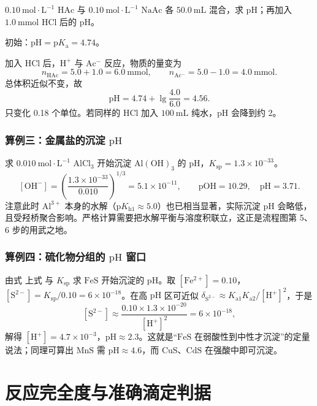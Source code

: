 \documentclass[UTF8]{ctexbook}
\begin{document}
$0.10\ \mathrm{mol\cdot L^{-1}}$ $\mathrm{HAc}$ 与 $0.10\ \mathrm{mol\cdot L^{-1}}$ $\mathrm{NaAc}$ 各 $50.0\ \mathrm{mL}$ 混合，求 $\mathrm{pH}$；再加入 $1.0\ \mathrm{mmol}$ $\mathrm{HCl}$ 后的 $\mathrm{pH}$。

初始：$\mathrm{pH}=\mathrm{p}K_{\mathrm{a}}=4.74$。

加入 $\mathrm{HCl}$ 后，$\mathrm{H^+}$ 与 $\mathrm{Ac^-}$ 反应，物质的量变为
\[
n_{\mathrm{HAc}}=5.0+1.0=6.0\ \mathrm{mmol},\qquad
n_{\mathrm{Ac^-}}=5.0-1.0=4.0\ \mathrm{mmol}.
\]
总体积近似不变，故
\[
\mathrm{pH}=4.74+\lg\frac{4.0}{6.0}=4.56.
\]
只变化 0.18 个单位。若同样的 $\mathrm{HCl}$ 加入 $100\ \mathrm{mL}$ 纯水，$\mathrm{pH}$ 会降到约 2。

\subsubsection{算例三：金属盐的沉淀 $\mathrm{pH}$}

求 $0.010\ \mathrm{mol\cdot L^{-1}}$ $\mathrm{AlCl_3}$ 开始沉淀 $\mathrm{Al(OH)_3}$ 的 $\mathrm{pH}$，$K_{\mathrm{sp}}=1.3\times10^{-33}$。
\[
[\mathrm{OH^-}]=\left(\frac{1.3\times10^{-33}}{0.010}\right)^{1/3}=5.1\times10^{-11},
\qquad
\mathrm{pOH}=10.29,\quad \mathrm{pH}=3.71.
\]
注意此时 $\mathrm{Al^{3+}}$ 本身的水解（$\mathrm{p}K_{\mathrm{h1}}\approx5.0$）也已相当显著，实际沉淀 $\mathrm{pH}$ 会略低，且受羟桥聚合影响。严格计算需要把水解平衡与溶度积联立，这正是流程图第 5、6 步的用武之地。

\subsubsection{算例四：硫化物分组的 $\mathrm{pH}$ 窗口}

由式 上式 与 $K_{\mathrm{sp}}$ 求 $\mathrm{FeS}$ 开始沉淀的 $\mathrm{pH}$。取 $[\mathrm{Fe^{2+}}]=0.10$，$[\mathrm{S^{2-}}]=K_{\mathrm{sp}}/0.10=6\times10^{-18}$。在高 $\mathrm{pH}$ 区可近似 $\delta_{\mathrm{S^{2-}}}\approx K_{\mathrm{a1}}K_{\mathrm{a2}}/[\mathrm{H^+}]^2$，于是
\[
[\mathrm{S^{2-}}]\approx\frac{0.10\times1.3\times10^{-20}}{[\mathrm{H^+}]^2}=6\times10^{-18},
\]
解得 $[\mathrm{H^+}]=4.7\times10^{-3}$，$\mathrm{pH}\approx2.3$。这就是“$\mathrm{FeS}$ 在弱酸性到中性才沉淀”的定量说法；同理可算出 $\mathrm{MnS}$ 需 $\mathrm{pH}\approx4.6$，而 $\mathrm{CuS}$、$\mathrm{CdS}$ 在强酸中即可沉淀。
\newpage



\newpage
\section{反应完全度与准确滴定判据}
\end{document}
